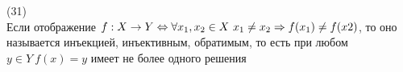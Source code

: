 (31)\\
Если отображение $f: X \to Y \Leftrightarrow \forall x_1, x_2 \in X\ x_1\neq x_2 \Rightarrow f(x_1)\neq f(x2)$, то оно называется инъекцией, инъективным, обратимым, то есть при любом $y \in Y\ f(x)=y$ имеет не более одного решения